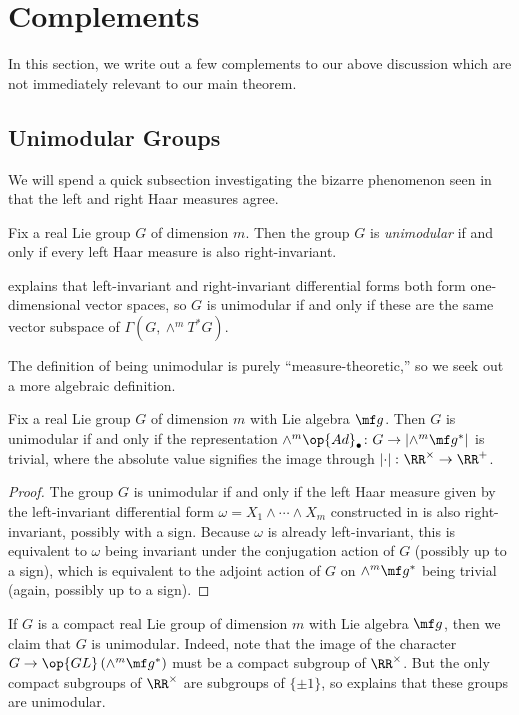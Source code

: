 \documentclass{amsart}
\begin{document}
\appendix
\section{Complements} \label{sec:comp}
In this section, we write out a few complements to our above discussion which are not immediately relevant to our main theorem.

\subsection{Unimodular Groups}
We will spend a quick subsection investigating the bizarre phenomenon seen in  that the left and right Haar measures agree.
\begin{definition}[unimodular]
	Fix a real Lie group $G$ of dimension $m$. Then the group $G$ is \textit{unimodular} if and only if every left Haar measure is also right-invariant.
\end{definition}
\begin{remark}
	 explains that left-invariant and right-invariant differential forms both form one-dimensional vector spaces, so $G$ is unimodular if and only if these are the same vector subspace of $\Gamma(G,\land^mT^*G)$.
\end{remark}
The definition of being unimodular is purely ``measure-theoretic,'' so we seek out a more algebraic definition.
\begin{lemma} \label{lem:det-adjoint-for-unimodular}
	Fix a real Lie group $G$ of dimension $m$ with Lie algebra $\mf g$. Then $G$ is unimodular if and only if the representation $\land^m\op{Ad}_\bullet\colon G\to\left|\land^m\mf g^*\right|$ is trivial, where the absolute value signifies the image through $\left|\cdot\right|\colon\RR^\times\to\RR^+$.
\end{lemma}
\begin{proof}
	The group $G$ is unimodular if and only if the left Haar measure given by the left-invariant differential form $\omega=X_1\land\cdots\land X_m$ constructed in  is also right-invariant, possibly with a sign. Because $\omega$ is already left-invariant, this is equivalent to $\omega$ being invariant under the conjugation action of $G$ (possibly up to a sign), which is equivalent to the adjoint action of $G$ on $\land^m\mf g^*$ being trivial (again, possibly up to a sign).
\end{proof}
\begin{example} \label{ex:compact-unimodular}
	If $G$ is a compact real Lie group of dimension $m$ with Lie algebra $\mf g$, then we claim that $G$ is unimodular. Indeed, note that the image of the character $G\to\op{GL}\left(\land^m\mf g^*\right)$ must be a compact subgroup of $\RR^\times$. But the only compact subgroups of $\RR^\times$ are subgroups of $\{\pm1\}$, so  explains that these groups are unimodular.
\end{example}
\end{document}
